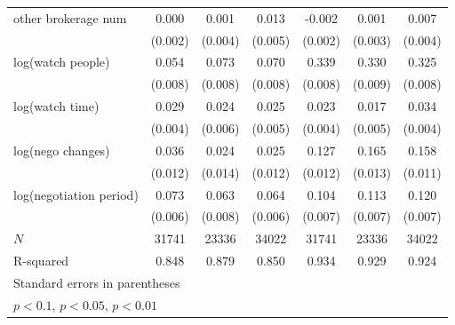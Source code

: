 {\begin{adjustbox}{max width=\textwidth}
\begin{tabular}{l*{6}{c}}
\addlinespace
other brokerage num  &       0.000         &       0.001         &       0.013\sym{**} &      -0.002         &       0.001         &       0.007\sym{*}  \\
            &     (0.002)         &     (0.004)         &     (0.005)         &     (0.002)         &     (0.003)         &     (0.004)         \\
\addlinespace
log(watch people)&       0.054\sym{***}&       0.073\sym{***}&       0.070\sym{***}&       0.339\sym{***}&       0.330\sym{***}&       0.325\sym{***}\\
            &     (0.008)         &     (0.008)         &     (0.008)         &     (0.008)         &     (0.009)         &     (0.008)         \\
\addlinespace
log(watch time)&       0.029\sym{***}&       0.024\sym{***}&       0.025\sym{***}&       0.023\sym{***}&       0.017\sym{***}&       0.034\sym{***}\\
            &     (0.004)         &     (0.006)         &     (0.005)         &     (0.004)         &     (0.005)         &     (0.004)         \\
\addlinespace
log(nego changes)&       0.036\sym{***}&       0.024\sym{*}  &       0.025\sym{**} &       0.127\sym{***}&       0.165\sym{***}&       0.158\sym{***}\\
            &     (0.012)         &     (0.014)         &     (0.012)         &     (0.012)         &     (0.013)         &     (0.011)         \\
\addlinespace
log(negotiation period)&       0.073\sym{***}&       0.063\sym{***}&       0.064\sym{***}&       0.104\sym{***}&       0.113\sym{***}&       0.120\sym{***}\\
            &     (0.006)         &     (0.008)         &     (0.006)         &     (0.007)         &     (0.007)         &     (0.007)         \\
\midrule
\(N\)       &       31741         &       23336         &       34022         &       31741         &       23336         &       34022         \\
R-squared   &       0.848         &       0.879         &       0.850         &       0.934         &       0.929         &       0.924         \\
\bottomrule
\multicolumn{7}{l}{\footnotesize Standard errors in parentheses}\\
\multicolumn{7}{l}{\footnotesize \sym{*} \(p<0.1\), \sym{**} \(p<0.05\), \sym{***} \(p<0.01\)}\\
\end{tabular}
\end{adjustbox}
}
